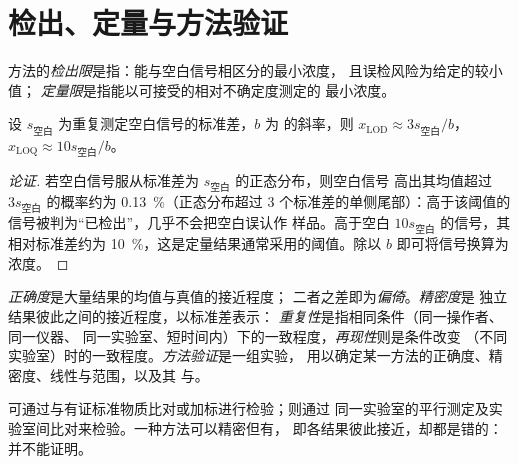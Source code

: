 \section{检出、定量与方法验证}

\begin{definition}[检出限与定量限]\label{def:b2:measurement-statistics:limits}
方法的\emph{检出限}是指：能与空白信号相区分的最小浓度，
且误检风险为给定的较小值；
\emph{定量限}是指能以可接受的相对不确定度测定的
最小浓度。
\end{definition}

\begin{proposition}[常用估计]\label{prop:b2:measurement-statistics:lod}
设 $s_{\text{空白}}$ 为重复测定空白信号的标准差，$b$ 为
的斜率，则 $x_{\mathrm{LOD}} \approx 3s_{\text{空白}}/b$，$x_{\mathrm{LOQ}} \approx
10s_{\text{空白}}/b$。
\end{proposition}

\begin{proof}[论证]
若空白信号服从标准差为 $s_{\text{空白}}$ 的正态分布，则空白信号
高出其均值超过 $3s_{\text{空白}}$ 的概率约为 0.13~\%（正态分布超过
3 个标准差的单侧尾部）：高于该阈值的信号被判为“已检出”，几乎不会把空白误认作
样品。高于空白 $10s_{\text{空白}}$ 的信号，其相对标准差约为
10~\%，这是定量结果通常采用的阈值。除以 $b$ 即可将信号换算为
浓度。
\end{proof}

\begin{definition}[方法验证]\label{def:b2:measurement-statistics:validation}
\emph{正确度}是大量结果的均值与真值的接近程度；
二者之差即为\emph{偏倚}。\emph{精密度}是
独立结果彼此之间的接近程度，以标准差表示：
\emph{重复性}是指相同条件（同一操作者、同一仪器、
同一实验室、短时间内）下的一致程度，\emph{再现性}则是条件改变
（不同实验室）时的一致程度。\emph{方法验证}是一组实验，
用以确定某一方法的正确度、精密度、线性与范围，以及其
与。
\end{definition}

可通过与有证标准物质比对或加标进行检验；则通过
同一实验室的平行测定及实验室间比对来检验。一种方法可以精密但有，
即各结果彼此接近，却都是错的：并不能证明。

